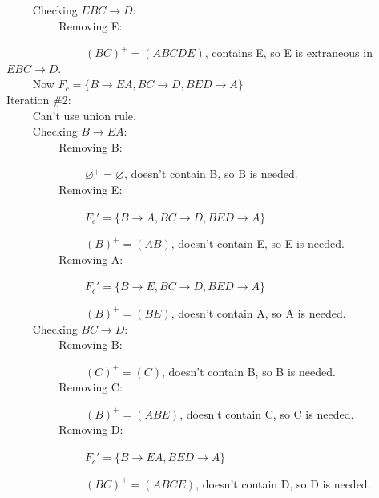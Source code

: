 \documentclass[a4paper]{article}
\begin{document}
	~~~~ Checking $EBC\rightarrow D:$ \\
		
	~~~~ ~~~~ Removing E: 
	
	~~~~ ~~~~ ~~~~ $ (BC)^+=(ABCDE) $, contains E, so E is extraneous in $EBC\rightarrow D$. \\
	
	~~~~ Now $F_c = \{B \rightarrow EA, BC \rightarrow D, BED \rightarrow A\}$ \\
	
	Iteration \#2: \\
	
	~~~~ Can't use union rule. \\
	
	~~~~ Checking $B\rightarrow EA:$ \\
		
	~~~~ ~~~~ Removing B: 
	
	~~~~ ~~~~ ~~~~ $ \varnothing^+=\varnothing $, doesn't contain B, so B is needed. \\
		
	~~~~ ~~~~ Removing E: 
	
	~~~~ ~~~~ ~~~~ $ F_c'=\{B\rightarrow A, BC \rightarrow D, BED \rightarrow A\}$ 
	
	~~~~ ~~~~ ~~~~ $ (B)^+=(AB) $, doesn't contain E, so E is needed. \\
		
	~~~~ ~~~~ Removing A: 
	
	~~~~ ~~~~ ~~~~ $ F_c'=\{B\rightarrow E, BC \rightarrow D, BED \rightarrow A\}$ 
	
	~~~~ ~~~~ ~~~~ $ (B)^+=(BE) $, doesn't contain A, so A is needed. \\
		
	~~~~ Checking $BC\rightarrow D:$ \\
		
	~~~~ ~~~~ Removing B: 
	
	~~~~ ~~~~ ~~~~ $ (C)^+=(C) $, doesn't contain B, so B is needed. \\
		
	~~~~ ~~~~ Removing C: 
	
	~~~~ ~~~~ ~~~~ $ (B)^+=(ABE) $, doesn't contain C, so C is needed. \\
		
	~~~~ ~~~~ Removing D: 
	
	~~~~ ~~~~ ~~~~ $ F_c'=\{B\rightarrow EA, BED \rightarrow A\}$ 
	
	~~~~ ~~~~ ~~~~ $ (BC)^+=(ABCE) $, doesn't contain D, so D is needed. \\
		
\end{document}
